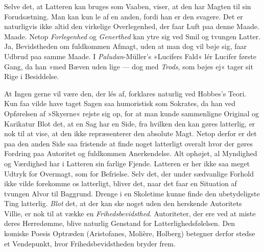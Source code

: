 \documentclass[12pt,a4paper,openany]{book}
\newcommand{\opage}[1]{\marginnote{\footnotesize\textit{[#1]}}}
\begin{document}
Selve det, at Latteren kan bruges som Vaaben, viser, at den har Magten
til sin Forudsætning. Man kan kun le af en anden, fordi han er den
svagere. Det er naturligvis ikke altid den virkelige Overlegenhed, der
faar Luft paa denne Maade. Maade. Netop \emph{Forlegenhed} og
\emph{Generthed} kan ytre sig ved Smil og tvungen Latter. Ja,
Bevidstheden om fuldkommen Afmagt, uden at man dog vil bøje sig, faar
Udbrud paa samme Maade. I \emph{Paludan}-Müller’s »Lucifers Fald« lér
Lucifer første Gang, da han »med Bæven uden lige --- dog med
\emph{Trods}, som bøjes ej« tager sit Rige i Besiddelse.

At Ingen gerne vil være den, der lés af, forklares naturlig ved Hobbes’s
Teori. Kun faa vilde have taget Sagen saa humoristisk som Sokrates, da
han ved Opførelsen af »Skyerne« rejste sig op, for at man kunde
sammenligne Original og Karikatur Blot det, at en Sag har en Side, fra
hvilken den kan gøres latterlig, er nok til at vise, at den ikke
repræsenterer den absolute Magt. Netop derfor er det paa den anden Side
saa fristende at finde noget latterligt overalt hvor der gøres Fordring
paa Autoritet og fuldkommen Anerkendelse. Alt ophøjet, al Myndighed og
Værdighed har i Latteren sin farlige Fjende. Latteren er her ikke saa
meget Udtryk for Overmagt, som for Befrielse. Selv det, der under
sædvanlige Forhold ikke vilde forekomme os latterligt, bliver det, naar
det faar en Situation af tvungen Alvor til Baggrund. Drenge i en
Skoletime kunne finde den ubetydeligste Ting latterlig. \emph{Blot} det,
at der kan ske noget uden den herskende Autoritets Villie,
\opage{348}er nok til at vække en \emph{Frihedsbevidsthed}. Autoriteter,
der ere ved at miste deres Herredømme, blive naturlig Genstand for
Latterlighedsfølelsen. Den komiske Poesis Optræden (Aristofanes,
Molière, Holberg) betegner derfor stedse et Vendepunkt, hvor
Frihedsbevidstheden bryder frem.
\end{document}
